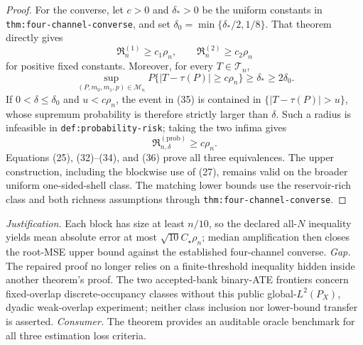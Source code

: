 \documentclass{article}
\begin{document}
\begin{proof}
For the converse, let \(c>0\) and \(\delta_*>0\) be the uniform constants in
\texttt{thm:four-channel-converse}, and set
\(\delta_0=\min\{\delta_*/2,1/8\}\).  That theorem directly gives
\[
\mathfrak R_n^{(1)}\geq c_1\rho_n,
\qquad
\mathfrak R_n^{(2)}\geq c_2\rho_n                                 \tag{34}
\]
for positive fixed constants.  Moreover, for every \(T\in\mathcal T_n\),
\[
\sup_{(P,m_0,m_1,p)\in\mathcal M_n}
P\{|T-\tau(P)|\geq c\rho_n\}
\geq\delta_*\geq2\delta_0.                                       \tag{35}
\]
If \(0<\delta\leq\delta_0\) and \(u<c\rho_n\), the event in (35) is
contained in \(\{|T-\tau(P)|>u\}\), whose supremum probability is therefore
strictly larger than \(\delta\).  Such a radius is infeasible in
\texttt{def:probability-risk}; taking the two infima gives
\[
\mathfrak R_{n,\delta}^{(\mathrm{prob})}\geq c\rho_n.               \tag{36}
\]
Equations (25), (32)--(34), and (36) prove all three equivalences.  The upper
construction, including the blockwise use of (27), remains valid on the
broader uniform one-sided-shell class.  The matching lower bounds use the
reservoir-rich class and both richness assumptions through
\texttt{thm:four-channel-converse}.
\end{proof}
\par\smallskip\noindent \textit{Justification.} Each block has size at least \(n/10\), so the declared all-\(N\) inequality yields mean absolute error at most \(\sqrt{10}C_\star\rho_n\); median amplification then closes the root-MSE upper bound against the established four-channel converse. \textit{Gap.} The repaired proof no longer relies on a finite-threshold inequality hidden inside another theorem's proof. The two accepted-bank binary-ATE frontiers concern fixed-overlap discrete-occupancy classes without this public global-\(L^2(P_X)\), dyadic weak-overlap experiment; neither class inclusion nor lower-bound transfer is asserted. \textit{Consumer.} The theorem provides an auditable oracle benchmark for all three estimation loss criteria.
\end{document}
